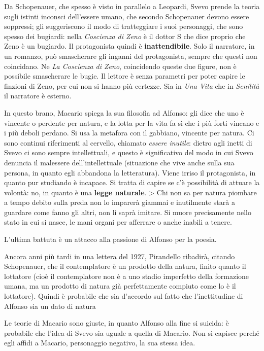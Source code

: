 Da Schopenauer, che spesso è visto in parallelo a Leopardi, Svevo prende la teoria sugli istinti inconsci dell'essere umano, che secondo Schopenauer devono essere soppressi; gli suggeriscono il modo di tratteggiare i suoi personaggi, che sono spesso dei bugiardi: nella \textit{Coscienza di Zeno} è il dottor S che dice proprio che Zeno è un bugiardo. Il protagonista quindi è \textbf{inattendibile}. Solo il narratore, in un romanzo, può smascherare gli inganni del protagonista, sempre che questi non coincidano. Ne \textit{La Coscienza di Zeno}, coincidendo queste due figure, non è possibile smascherare le bugie. Il lettore è senza parametri per poter capire le finzioni di Zeno, per cui non si hanno più certezze. Sia in \textit{Una Vita} che in \textit{Senilità} il narratore è esterno.

In questo brano, Macario spiega la sua filosofia ad Alfonso: gli dice che uno è vincente o perdente per natura, e la lotta per la vita fa sì che i più forti vincano e i più deboli perdano. Si usa la metafora con il gabbiano, vincente per natura. Ci sono continui riferimenti al cervello, chiamato \textit{essere inutile}: dietro agli inetti di Svevo ci sono sempre intellettuali, e questo è significativo del modo in cui Svevo denuncia il malessere dell'intellettuale (situazione che vive anche sulla sua persona, in quanto egli abbandona la letteratura). Viene irriso il protagonista, in quanto pur studiando è incapace.
Si tratta di capire se c'è possibilità di attuare la volontà: no, in quanto è una \textbf{legge naturale}.
> Chi non sa per natura piombare a tempo debito sulla preda non lo imparerà giammai e inutilmente starà a guardare come fanno gli altri, non li saprà imitare. Si muore precisamente nello stato in cui si nasce, le mani organi per afferrare o anche inabili a tenere.

L'ultima battuta è un attacco alla passione di Alfonso per la poesia.

Ancora anni più tardi in una lettera del 1927, Pirandello ribadirà, citando Schopenauer, che il contemplatore è un prodotto della natura, finito quanto il lottatore (cioè il contemplatore non è a uno stadio imperfetto della formazione umana, ma un prodotto di natura già perfettamente compiuto come lo è il lottatore). Quindi è probabile che sia d'accordo sul fatto che l'inettitudine di Alfonso sia un dato di natura

Le teorie di Macario sono giuste, in quanto Alfonso alla fine si suicida: è probabile che l'idea di Svevo sia uguale a quella di Macario.
Non si capisce perché egli affidi a Macario, personaggio negativo, la sua stessa idea.


